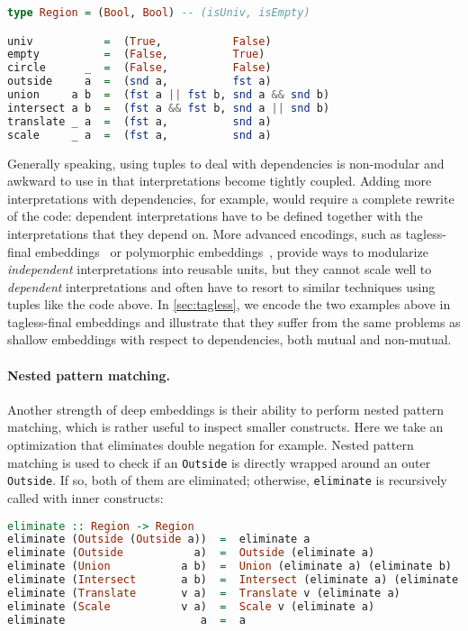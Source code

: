 \begin{lstlisting}[language=Haskell,deletekeywords={union,intersect}]
type Region = (Bool, Bool) -- (isUniv, isEmpty)

univ           =  (True,           False)
empty          =  (False,          True)
circle      _  =  (False,          False)
outside     a  =  (snd a,          fst a)
union     a b  =  (fst a || fst b, snd a && snd b)
intersect a b  =  (fst a && fst b, snd a || snd b)
translate _ a  =  (fst a,          snd a)
scale     _ a  =  (fst a,          snd a)
\end{lstlisting}

\noindent 
Generally speaking, using tuples to deal with dependencies is non-modular and
awkward to use in that interpretations become tightly coupled. Adding more
interpretations with dependencies, for example, would require a complete rewrite
of the code: dependent interpretations have to be defined together with the
interpretations that they depend on. More advanced encodings, such as
tagless-final embeddings~\citep{kiselyov2010typed} or polymorphic
embeddings~\citep{hofer2008polymorphic}, provide ways to modularize
\emph{independent} interpretations into reusable units, but they cannot scale
well to \emph{dependent} interpretations and often have to resort to similar
techniques using tuples like the code above. In \autoref{sec:tagless}, we encode
the two examples above in tagless-final embeddings and illustrate that they
suffer from the same problems as shallow embeddings with respect to
dependencies, both mutual and non-mutual.

\paragraph{Nested pattern matching.} \label{sec:nested}
Another strength of deep embeddings is their ability to perform nested pattern
matching, which is rather useful to inspect smaller constructs. Here we take
an optimization that eliminates double negation for example. Nested pattern
matching is used to check if an \lstinline{Outside} is directly wrapped around
an outer \lstinline{Outside}. If so, both of them are eliminated; otherwise,
\lstinline{eliminate} is recursively called with inner constructs:

\begin{lstlisting}[language=Haskell]
eliminate :: Region -> Region
eliminate (Outside (Outside a))  =  eliminate a
eliminate (Outside           a)  =  Outside (eliminate a)
eliminate (Union           a b)  =  Union (eliminate a) (eliminate b)
eliminate (Intersect       a b)  =  Intersect (eliminate a) (eliminate b)
eliminate (Translate       v a)  =  Translate v (eliminate a)
eliminate (Scale           v a)  =  Scale v (eliminate a)
eliminate                     a  =  a
\end{lstlisting}

